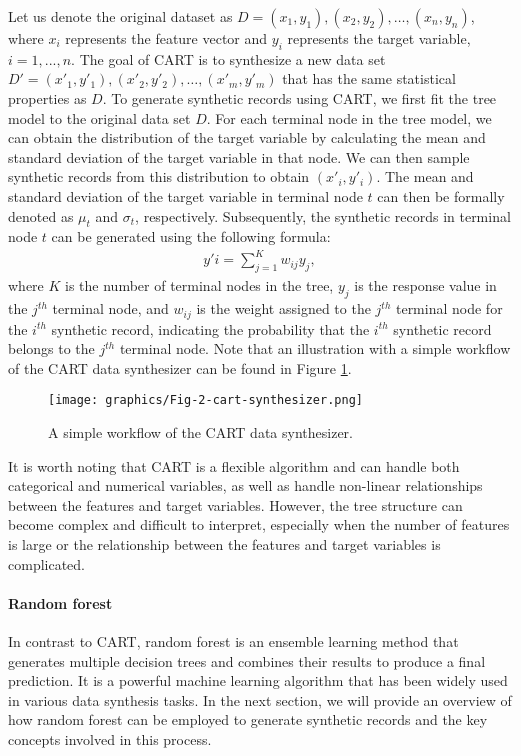 Let us denote the original dataset as $D = { (x_1,y_1),(x_2,y_2),\dots,(x_n,y_n)}$, where $x_i$ represents the feature vector and $y_i$ represents the target variable, $i=1,...,n$. The goal of CART is to synthesize a new data set $D' = { (x'_1,y'_1),(x'_2,y'_2),\dots,(x'_m,y'_m)}$ that has the same statistical properties as $D$. To generate synthetic records using CART, we first fit the tree model to the original data set $D$. For each terminal node in the tree model, we can obtain the distribution of the target variable by calculating the mean and standard deviation of the target variable in that node. We can then sample synthetic records from this distribution to obtain $(x'_i,y'_i)$. The mean and standard deviation of the target variable in terminal node $t$ can then be formally denoted as $\mu_t$ and $\sigma_t$, respectively. Subsequently, the synthetic records in terminal node $t$ can be generated using the following formula:
\begin{align}
    \label{equ:cart}
    y'i = \sum_{j=1}^{K} w_{ij} y_{j},
\end{align}
where $K$ is the number of terminal nodes in the tree, $y_j$ is the response value in the $j^{th}$ terminal node, and $w_{ij}$ is the weight assigned to the $j^{th}$ terminal node for the $i^{th}$ synthetic record, indicating the probability that the $i^{th}$ synthetic record belongs to the $j^{th}$ terminal node. Note that an illustration with a simple workflow of the CART data synthesizer can be found in Figure \ref{fig:cartsyn}.
\begin{figure}[H]
    \centering
    \texttt{[image: graphics/Fig-2-cart-synthesizer.png]}    
    \caption{A simple workflow of the CART data synthesizer.}
    \label{fig:cartsyn}
\end{figure}

It is worth noting that CART is a flexible algorithm and can handle both categorical and numerical variables, as well as handle non-linear relationships between the features and target variables. However, the tree structure can become complex and difficult to interpret, especially when the number of features is large or the relationship between the features and target variables is complicated.

\paragraph{Random forest}
In contrast to CART, random forest \citep{rigatti2017random} is an ensemble learning method that generates multiple decision trees and combines their results to produce a final prediction. It is a powerful machine learning algorithm that has been widely used in various data synthesis tasks. In the next section, we will provide an overview of how random forest can be employed to generate synthetic records and the key concepts involved in this process.

